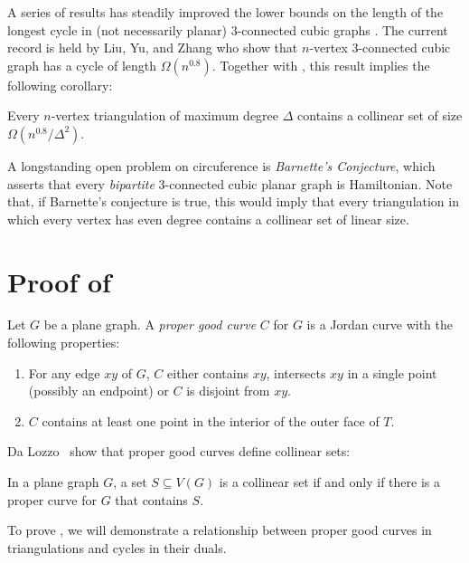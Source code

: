\documentclass{patmorin}
\begin{document}
A series of results has steadily improved the lower bounds on the length
of the longest cycle in (not necessarily planar) 3-connected cubic
graphs \cite{X,X,X}.  The current record is held by Liu, Yu, and Zhang
\cite{liu.yu.zhang:circumference} who show that $n$-vertex 3-connected
cubic graph has a cycle of length $\Omega(n^{0.8})$.
Together with , this result implies the following corollary:

\begin{cor}
  Every $n$-vertex triangulation of maximum degree $\Delta$ contains a
  collinear set of size $\Omega(n^{0.8}/\Delta^2)$.
\end{cor}


A longstanding open problem on circuference is \emph{Barnette's
Conjecture}, which asserts that every \emph{bipartite} 3-connected cubic
planar graph is Hamiltonian. Note that, if Barnette's conjecture is
true, this would imply that every triangulation in which every vertex
has even degree contains a collinear set of linear size.  



\section{Proof of }

Let $G$ be a plane graph. A \emph{proper good curve} $C$ for $G$ is a
Jordan curve with the following properties:
\begin{enumerate}
  \item For any edge $xy$ of $G$, $C$ either contains $xy$, intersects
  $xy$ in a single point (possibly an endpoint) or $C$ is disjoint
  from $xy$.  
  \item $C$ contains at least one point in the interior of
  the outer face of $T$.
\end{enumerate}

Da Lozzo \etal\ show that proper good curves define collinear sets:

\begin{thm}
  In a plane graph $G$, a set $S\subseteq V(G)$ is a collinear set if
  and only if there is a proper curve for $G$ that contains $S$.
\end{thm}

To prove , we will demonstrate a relationship between proper good curves in triangulations and cycles in their duals.  


\section{}

\newpage


\end{document}
